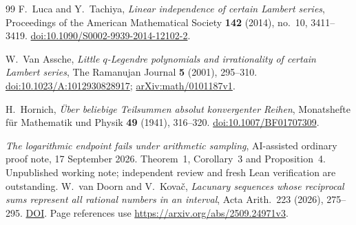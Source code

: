 \documentclass[11pt]{article}
\begin{document}
\begin{thebibliography}{99}
F.~Luca and Y.~Tachiya,
\emph{Linear independence of certain Lambert series},
Proceedings of the American Mathematical Society \textbf{142} (2014), no.~10, 3411--3419.
\href{https://doi.org/10.1090/S0002-9939-2014-12102-2}{doi:10.1090/S0002-9939-2014-12102-2}.

W.~Van Assche,
\emph{Little $q$-Legendre polynomials and irrationality of certain Lambert series},
The Ramanujan Journal \textbf{5} (2001), 295--310.
\href{https://doi.org/10.1023/A:1012930828917}{doi:10.1023/A:1012930828917};
\href{https://arxiv.org/abs/math/0101187v1}{arXiv:math/0101187v1}.

H.~Hornich,
\emph{\"Uber beliebige Teilsummen absolut konvergenter Reihen},
Monatshefte f\"ur Mathematik und Physik \textbf{49} (1941), 316--320.
\href{https://doi.org/10.1007/BF01707309}{doi:10.1007/BF01707309}.

 \emph{The logarithmic endpoint fails under arithmetic
  sampling}, AI-assisted ordinary proof note, 17 September 2026.
  Theorem~1, Corollary~3 and Proposition~4.  Unpublished working note;
  independent review and fresh Lean verification are outstanding.
 W.~van Doorn and V.~Kova\v{c},
  \emph{Lacunary sequences whose reciprocal sums represent all rational
  numbers in an interval}, Acta Arith.\ 223 (2026), 275--295.
  \href{https://doi.org/10.4064/aa251001-13-1}{DOI}.
  Page references use \url{https://arxiv.org/abs/2509.24971v3}.

\end{thebibliography}

\companionpapercontext
\end{document}
